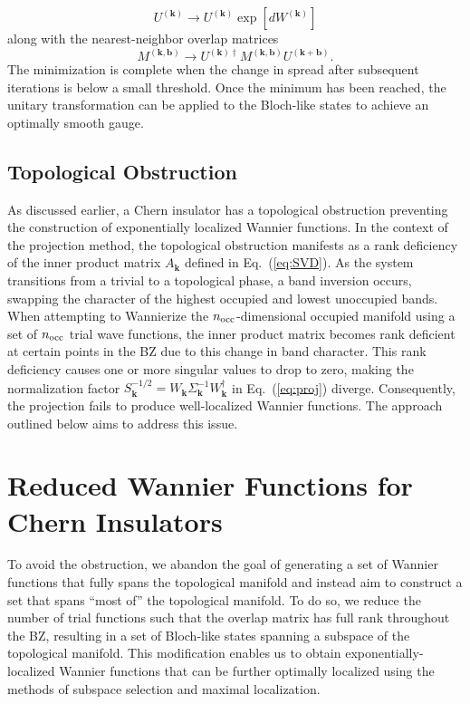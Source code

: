 \documentclass[galley,aps,pra,10pt,amsmath,amssymb,
    superscriptaddress,nofootinbib,longbibliography]{revtex4-2}
\def\Red#1{\textcolor{red}{#1}}
\newcounter{comm}
\newcommand{\seclab}[1]{\label{sec:#1}{\Red{\small\;\;[sec:~#1]}}}
\newcommand{\seclab}[1]{\label{sec:#1}}
\newcommand{\eq}[1]{Eq.~(\ref{eq:#1})}
\begin{document}
\begin{equation}
    U^{(\mathbf{k})} \rightarrow U^{(\mathbf{k})} \exp\left[ dW^{(\mathbf{k})} \right]
\end{equation}
along with the nearest-neighbor overlap matrices 
\begin{equation}
    M^{(\mathbf{k}, \mathbf{b})} \rightarrow U^{(\mathbf{k})\dagger} M^{(\mathbf{k}, \mathbf{b})} U^{(\mathbf{k} + \mathbf{b})} .
\end{equation}
The minimization is complete when the change in spread after subsequent iterations is below a small threshold. Once the minimum has been reached, the unitary transformation can be applied to the Bloch-like states to achieve an optimally smooth gauge.


\subsection{Topological Obstruction}

As discussed earlier, a Chern insulator has a topological obstruction preventing the construction of exponentially localized Wannier functions. In the context of the projection method, the topological obstruction manifests as a rank deficiency of the inner product matrix $A_{\mathbf{k}}$ defined in \eq{SVD}. As the system transitions from a trivial to a topological phase, a band inversion occurs, swapping the character of the highest occupied and lowest unoccupied bands. When attempting to Wannierize the $n_{\rm occ}$-dimensional occupied manifold using a set of $n_{\rm occ}$ trial wave functions, the inner product matrix becomes rank deficient at certain points in the BZ due to this change in band character. This rank deficiency causes one or more singular values to drop to zero, making the normalization factor $S_{\mathbf{k}}^{-1/2} = W_{\mathbf{k}} \Sigma_{\mathbf{k}}^{-1} W_{\mathbf{k}}^{\dagger}$ in \eq{proj} diverge. Consequently, the projection fails to produce well-localized Wannier functions. The approach outlined below aims to address this issue.

\section{Reduced Wannier Functions for Chern Insulators}
\label{Reduced_WF}
\seclab{avoid-topo}

To avoid the obstruction, we abandon the goal of generating a set of Wannier functions that fully spans the topological manifold and instead aim to construct a set that spans ``most of'' the topological manifold. To do so, we reduce the number of trial functions such that the overlap matrix has full rank throughout the BZ, resulting in a set of Bloch-like states spanning a subspace of the topological manifold. This modification enables us to obtain exponentially-localized Wannier functions that can be further optimally localized using the methods of subspace selection and maximal localization.
\end{document}
